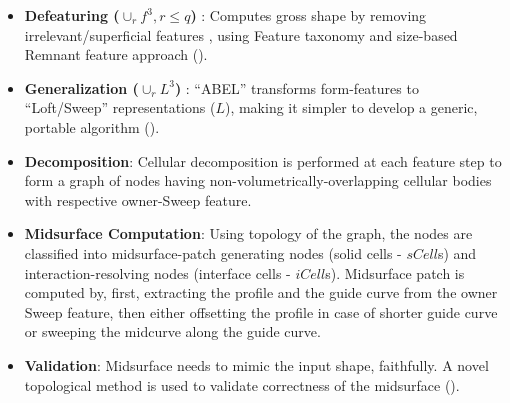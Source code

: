 \begin{minipage}[c]{\linewidth}
    \begin{minipage}[c]{0.45\linewidth}
\begin{itemize}[noitemsep,topsep=2pt,parsep=2pt,partopsep=2pt,leftmargin=*]

\item \textbf{Defeaturing ($\cup_rf^3, r \leq q$) }:  Computes gross shape by removing irrelevant/superficial features \cite{YogeshIITM2013}, using Feature taxonomy and size-based Remnant feature approach (\cite{YogeshCADConf2015}). 

\item \textbf{Generalization ($\cup_rL^3$) }: ``ABEL'' transforms form-features to ``Loft/Sweep'' representations ($L$), making it simpler to develop a generic, portable algorithm (\cite{YogeshIITG2014}). 

\item \textbf{Decomposition}: Cellular decomposition is performed at each feature step to form a graph of nodes having non-volumetrically-overlapping cellular bodies with respective owner-Sweep feature. 

\item \textbf{Midsurface Computation}: Using topology of the graph, the nodes are classified into midsurface-patch generating nodes (solid cells - $sCell$s) and interaction-resolving nodes (interface cells - $iCell$s). Midsurface patch is computed by, first, extracting the profile and the guide curve from the owner Sweep feature, then either offsetting the profile in case of shorter guide curve or sweeping the midcurve \cite{YogeshETES2014,YogeshIJCAET2017} along the guide curve.

\item \textbf{Validation}:  Midsurface needs to  mimic the input shape, faithfully. A novel topological method is used to validate correctness of the midsurface (\cite{YogeshCADandA2015}).


\end{itemize}
\end{minipage}
\end{minipage}
